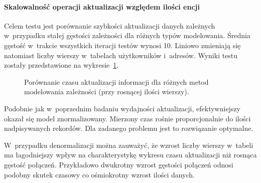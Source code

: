 \paragraph{Skalowalność operacji aktualizacji względem ilości encji}

Celem testu jest porównanie szybkości aktualizacji danych zależnych w~przypadku stałej gęstości zależności dla różnych typów modelowania. Średnia gęstość w~trakcie wszystkich iteracji testów wynosi 10. Liniowo zmieniają się natomiast liczby wierszy w~tabelach użytkowników i~adresów. Wyniki testu zostały przedstawione na wykresie~\ref{fig:update_time_relation_quantity_comparison}.

\begin{figure}[ht!]
	\centering

	\caption{Porównanie czasu aktualizacji informacji dla różnych metod modelowania zależności (przy rosnącej ilości wierszy).}
	\label{fig:update_time_relation_quantity_comparison}
\end{figure}

Podobnie jak w~poprzednim badaniu wydajności aktualizacji, efektywniejszy okazał się model znormalizowany. Mierzony czas rośnie proporcjonalnie do ilości nadpisywanych rekordów. Dla zadanego problemu jest to rozwiązanie optymalne.

W~przypadku denormalizacji można zauważyć, że wzrost liczby wierszy w~tabeli ma łagodniejszy wpływ na charakterystykę wykresu czasu aktualizacji niż rosnąca gęstość połączeń. Przykładowo dwukrotny wzrost gęstości połączeń odnosi podobny skutek czasowy co ośmiokrotny wzrost ilości danych. 

